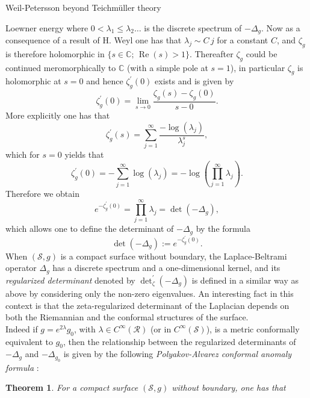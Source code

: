 \documentclass[12pt]{amsart}
\theoremstyle{plain}
\newtheorem{theorem}{Theorem}[section]
\theoremstyle{definition}
\theoremstyle{remark}
\numberwithin{equation}{section} %
\numberwithin{figure}{section} %
\begin{document}
\begin{section}{Weil-Petersson beyond Teichm\"uller theory}
\begin{subsection}{Loewner energy}
where \(0<\lambda_{1} \leq \lambda_{2} \ldots\) is the discrete spectrum of \(-\Delta_g\). Now as a consequence of a result of H. Weyl \cite{Weyl}  one has that 
$\lambda_{j}\sim C\, j$ for a constant $C$, and \(\zeta_{g}\) is therefore holomorphic in \(\{s\in \mathbb{C};\,\operatorname{Re}(s)>1\}\). Thereafter \(
\zeta_{g}\) could be continued meromorphically to \(\mathbb{C}\) (with a simple pole at $s=1$), in particular \(\zeta_{g}\) is holomorphic at $s=0$  and hence \(\zeta_{g}^{\prime}(0)\) exists and is given by
$$
\zeta_{g}^{\prime}(0)=\lim _{s \rightarrow 0} \frac{\zeta_{g}(s)-\zeta_{g}(0)}{s-0}.
$$
More explicitly one has that
\begin{equation*}
    \zeta_{g}^{\prime}(s)=\sum_{j=1}^{\infty}\frac{-\log \left(\lambda_{j}\right)}{\lambda_{j}^{s}},
\end{equation*}
which for \(s=0\) yields that
$$
\zeta_{g}^{\prime}(0)=-\sum_{j=1}^{\infty} \log\left(\lambda_{j}\right)=-\log \left(\prod_{j=1}^{\infty} \lambda_{j}\right).
$$
Therefore we obtain
$$
e^{-\zeta_{g}^{\prime}(0)}=\prod_{j=1}^{\infty} \lambda_{j}=\operatorname{det}\left(-\Delta_g\right),
$$
which allows one to define the determinant of \(-\Delta_g\) by the formula
\begin{equation}
  \operatorname{det}\left(-\Delta_g\right):=e^{-\zeta_{g}^{\prime}(0)}.  
\end{equation}
When \((\mathscr{S}, g)\) is a compact surface without boundary, the Laplace-Beltrami operator \(\Delta_g\) has a discrete spectrum and a one-dimensional kernel, and its {\it regularized determinant} denoted by $\det_{\zeta}^{\prime}(-\Delta_g)$ is defined in a similar way as above
by considering only the non-zero eigenvalues.
An interesting fact in this context is that the zeta-regularized determinant of the Laplacian depends on both the Riemannian and the conformal structures of the surface.\\
Indeed if \(g=e^{2 \lambda} g_{0}\), with $\lambda\in C^{\infty}(\mathscr{R})$ (or in $C^{\infty}(\mathscr{S})$), is a metric
conformally equivalent to \(g_{0}\), then the relationship between the regularized determinants of $-\Delta_g$ and $-\Delta_{g_0}$ is given by the following \emph{Polyakov-Alvarez conformal anomaly formula} \cite{OSSarPhil}:
\begin{theorem}\label{PolyakovAlvarez}
   For a
compact surface \((\mathscr{S}, g)\) without boundary, one has that


\end{theorem}
\end{subsection}
\end{section}
\end{document}

